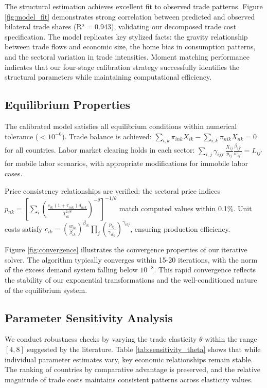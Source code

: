 The structural estimation achieves excellent fit to observed trade patterns. Figure \ref{fig:model_fit} demonstrates strong correlation between predicted and observed bilateral trade shares (R² = 0.943), validating our decomposed trade cost specification. The model replicates key stylized facts: the gravity relationship between trade flows and economic size, the home bias in consumption patterns, and the sectoral variation in trade intensities. Moment matching performance indicates that our four-stage calibration strategy successfully identifies the structural parameters while maintaining computational efficiency.

\subsection{Equilibrium Properties}

The calibrated model satisfies all equilibrium conditions within numerical tolerance ($< 10^{-6}$). Trade balance is achieved: $\sum_{i,k} \pi_{ink} X_{ik} - \sum_{i,k} \pi_{nik} X_{nk} = 0$ for all countries. Labor market clearing holds in each sector: $\sum_{i,j} \gamma_{ijj'} \frac{X_{ij}}{p_{ij}} \frac{\beta_{ij'}}{w_{ij'}} = L_{ij'}$ for mobile labor scenarios, with appropriate modifications for immobile labor cases.

Price consistency relationships are verified: the sectoral price indices $p_{nk} = \left[\sum_{i} \left(\frac{c_{ik}(1+\tau_{nik})d_{nik}}{T_{ik}^{1/\theta}}\right)^{-\theta}\right]^{-1/\theta}$ match computed values within 0.1\%. Unit costs satisfy $c_{ik} = \left(\frac{w_{ik}}{\beta_{ik}}\right)^{\beta_{ik}} \prod_{j} \left(\frac{p_{ij}}{\gamma_{ikj}}\right)^{\gamma_{ikj}}$, ensuring production efficiency.

Figure \ref{fig:convergence} illustrates the convergence properties of our iterative solver. The algorithm typically converges within 15-20 iterations, with the norm of the excess demand system falling below $10^{-8}$. This rapid convergence reflects the stability of our exponential transformations and the well-conditioned nature of the equilibrium system.

\subsection{Parameter Sensitivity Analysis}

We conduct robustness checks by varying the trade elasticity $\theta$ within the range $[4, 8]$ suggested by the literature. Table \ref{tab:sensitivity_theta} shows that while individual parameter estimates vary, key economic relationships remain stable. The ranking of countries by comparative advantage is preserved, and the relative magnitude of trade costs maintains consistent patterns across elasticity values.

